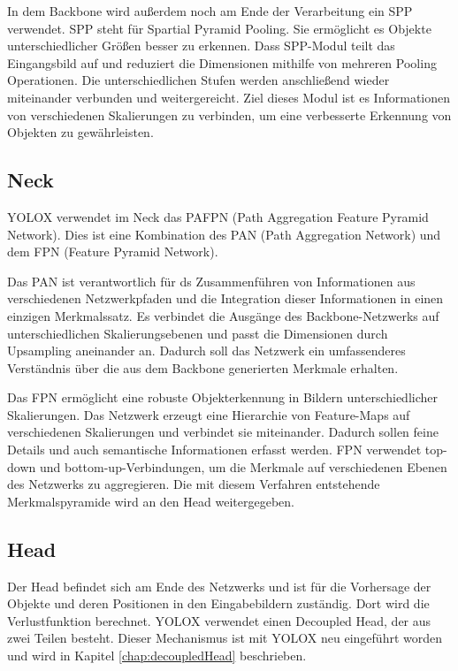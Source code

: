In dem Backbone wird außerdem noch am Ende der Verarbeitung ein SPP verwendet. SPP steht für Spartial Pyramid Pooling. Sie ermöglicht es Objekte unterschiedlicher Größen besser zu erkennen. Dass SPP-Modul teilt das Eingangsbild auf und reduziert die Dimensionen mithilfe von mehreren Pooling Operationen. Die unterschiedlichen Stufen werden anschließend wieder miteinander verbunden und weitergereicht. Ziel dieses Modul ist es Informationen von verschiedenen Skalierungen zu verbinden, um eine verbesserte Erkennung von Objekten zu gewährleisten. \cite{yoloxBackbone}

\subsection{Neck}
YOLOX verwendet im Neck das PAFPN (Path Aggregation Feature Pyramid Network). Dies ist eine Kombination des PAN (Path Aggregation Network) und dem FPN (Feature Pyramid Network). 

Das PAN ist verantwortlich für ds Zusammenführen von Informationen aus verschiedenen Netzwerkpfaden und die Integration dieser Informationen in einen einzigen Merkmalssatz. Es verbindet die Ausgänge des Backbone-Netzwerks auf unterschiedlichen Skalierungsebenen und passt die Dimensionen durch Upsampling aneinander an. Dadurch soll das Netzwerk ein umfassenderes Verständnis über die aus dem Backbone generierten Merkmale erhalten.

Das FPN ermöglicht eine robuste Objekterkennung in Bildern unterschiedlicher Skalierungen. Das Netzwerk erzeugt eine Hierarchie von Feature-Maps auf verschiedenen Skalierungen und verbindet sie miteinander. Dadurch sollen feine Details und auch semantische Informationen erfasst werden. FPN verwendet top-down und bottom-up-Verbindungen, um die Merkmale auf verschiedenen Ebenen des Netzwerks zu aggregieren. Die mit diesem Verfahren entstehende Merkmalspyramide wird an den Head weitergegeben. \cite{yoloxNeckPAN, yoloxNeckFPN}


\subsection{Head}
Der Head befindet sich am Ende des Netzwerks und ist für die Vorhersage der Objekte und deren Positionen in den Eingabebildern zuständig. Dort wird die Verlustfunktion berechnet. YOLOX verwendet einen Decoupled Head, der aus zwei Teilen besteht. Dieser Mechanismus ist mit YOLOX neu eingeführt worden und wird in Kapitel \ref{chap:decoupledHead} beschrieben.


